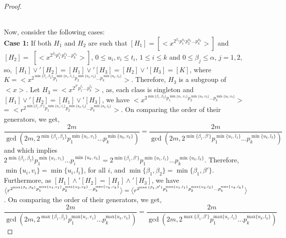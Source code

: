 \documentclass{article}
\theoremstyle{definition}
\begin{document}
\begin{proof}
\begin{figure}[h]
\begin{tikzpicture}[scale=1.5,  every node/.style={circle, fill=black, minimum size=6pt, inner sep=0pt}]
				
		\end{tikzpicture}
        \caption{}
\end{figure}\\
Now, consider the following cases: \vspace{0.2cm} \\
\textbf{Case 1:} If both $H_1$ and $H_2$ are such that $[H_1]=[\bigl<x^{2^{\beta_1}p_1^{u_1}p_2^{u_2}\dots p_k^{u_k}}\bigr>]$ and $[H_2]=$ $[\bigl<x^{2^{\beta_2}p_1^{v_1}p_2^{v_2}\dots p_k^{v_k}}\bigr>]$, $0\le u_i,v_i\le t_i$, $1\le i\le k$ and $0\le\beta_j \le\alpha$, $j=1,2$, so, $[H_1]\vee' [H_2]=[H_1]\vee' [H_3]=[H_2]\vee'[H_3]=[K]$, where $K=\bigl<x^{2^{\min\{\beta_1,\beta_2\}}p_1^{\min\{u_1,v_1\}}p_2^{\min\{u_2,v_2\}}\dots p_k^{\min\{u_k,v_k\}}}\bigr> $. Therefore, $H_3$ is a subgroup of $\bigl<x\bigr>$. Let $H_3=\bigl<x^{2^{\beta'}p_1^{l_1}\dots p_k^{l_k}}\bigr>$, as, each class is singleton and $[H_1]\vee' [H_2]=[H_1]\vee' [H_3]$, we have $\bigl<x^{2^{\min\{\beta_1,\beta_2\}}p_1^{\min\{u_1,v_1\}}p_2^{\min\{u_2,v_2\}}\dots p_k^{\min\{u_k,v_k\}}}\bigr>$ = $\bigl<r^{2^{\min\{\beta_1,\beta'\}}p_1^{\min\{u_1,l_1\}}p_2^{\min\{u_2,l_2\}}\dots p_k^{\min\{u_k,l_k\}}}\bigr>$. On comparing the order of their generators, we get, 
\begin{equation*}
 \frac{2m}{\gcd(2m, 2^{\min\{\beta_1,\beta_2\}}p_1^{\min\{u_1,v_1\}}\dots p_k^{\min\{u_k,v_k\}})}=   \frac{2m}{\gcd(2m, 2^{\min\{\beta_1,\beta'\}}p_1^{\min\{u_1,l_1\}}\dots p_k^{\min\{u_k,l_k\}}   )}
\end{equation*}
and which implies $2^{\min\{\beta_1,\beta_2\}}p_1^{\min\{u_1,v_1\}}\dots p_i^{\min\{u_k,v_k\}}=2^{\min\{\beta_1,\beta'\}}p_1^{\min\{u_1,l_1\}}\dots p_k^{\min\{u_k,l_k\}}$. Therefore, $\min\{u_i,v_i\}=\min\{u_i,l_i\}$, for all $i$, and $\min\{\beta_1,\beta_2\}=\min\{\beta_1,\beta'\}$. Furthermore, as $[H_1]\wedge' [H_2]=[H_1]\wedge'[H_3]$, we have $\bigl<r^{2^{\max\{\beta_1,\beta_2\}}p_1^{\text{max}\{u_1,v_1\}}p_2^{\text{max}\{u_2,v_2\}}\dots p_k^{\text{max}\{u_k,v_k\}}}\bigr>=\\\bigl<r^{2^{\max{\{\beta_1,\beta'\}}}p_1^{\text{max}\{u_1,l_1\}}p_2^{\text{max}\{u_2,l_2\}}\dots p_k^{\text{max}\{u_k,l_k\}}}\bigr>$. On comparing the order of their generators, we get,
\begin{equation*}
\frac{2m}{\gcd(2m, 2^{\max\{\beta_1,\beta_2\}}p_1^{\text{max}\{u_1,v_1\}}\dots p_k^{\text{max}\{u_k,v_k\}})}=\frac{2m}{\gcd(2m, 2^{\max\{\beta_1,\beta'\}}p_1^{\text{max}\{u_1,l_1\}}\dots p_k^{\text{max}\{u_k,l_k\}})}
\end{equation*}

\end{proof}
\end{document}
